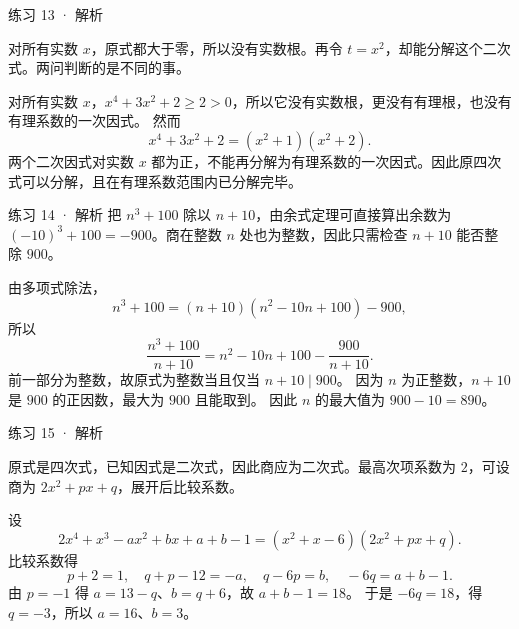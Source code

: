 
\begin{solution}[before skip=4pt plus 1pt,after skip=4pt plus 1pt,top=6pt,bottom=6pt]{练习 13 · 解析}

\think 对所有实数 $x$，原式都大于零，所以没有实数根。再令 $t=x^2$，却能分解这个二次式。两问判断的是不同的事。

\solve 对所有实数 $x$，$x^4+3x^2+2\ge2>0$，所以它没有实数根，更没有有理根，也没有有理系数的一次因式。
然而
\[x^4+3x^2+2=(x^2+1)(x^2+2).\]
两个二次因式对实数 $x$ 都为正，不能再分解为有理系数的一次因式。因此原四次式可以分解，且在有理系数范围内已分解完毕。


\end{solution}


\begin{solution}[breakable=false,before skip=4pt plus 1pt,after skip=4pt plus 1pt,top=6pt,bottom=6pt]{练习 14 · 解析}
\think 把 $n^3+100$ 除以 $n+10$，由余式定理可直接算出余数为 $(-10)^3+100=-900$。商在整数 $n$ 处也为整数，因此只需检查 $n+10$ 能否整除 $900$。

\solve 由多项式除法，
\[n^3+100=(n+10)(n^2-10n+100)-900,\]
所以
\[\frac{n^3+100}{n+10}=n^2-10n+100-\frac{900}{n+10}.\]
前一部分为整数，故原式为整数当且仅当 $n+10\mid900$。
因为 $n$ 为正整数，$n+10$ 是 $900$ 的正因数，最大为 $900$ 且能取到。
因此 $n$ 的最大值为 $900-10=890$。

\end{solution}




\begin{solution}[before skip=4pt plus 1pt,after skip=4pt plus 1pt,top=6pt,bottom=6pt]{练习 15 · 解析}

\think 原式是四次式，已知因式是二次式，因此商应为二次式。最高次项系数为 $2$，可设商为 $2x^2+px+q$，展开后比较系数。

\solve 设
\[2x^4+x^3-ax^2+bx+a+b-1=(x^2+x-6)(2x^2+px+q).\]
比较系数得
\[p+2=1,\quad q+p-12=-a,\quad q-6p=b,\quad -6q=a+b-1.\]
由 $p=-1$ 得 $a=13-q$、$b=q+6$，故 $a+b-1=18$。
于是 $-6q=18$，得 $q=-3$，所以 $a=16$、$b=3$。


\end{solution}

